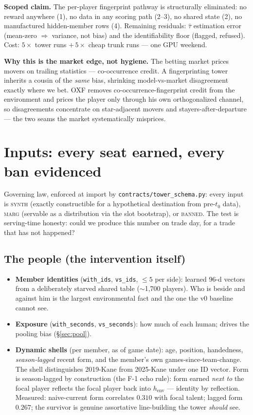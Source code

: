 \documentclass[11pt]{article}
\newcommand{\henv}{\ensuremath{h_{\mathrm{env}}}}
\begin{document}
\noindent\textbf{Scoped claim.} The per-player fingerprint pathway is
structurally eliminated: no reward anywhere (1), no data in any scoring path
(2--3), no shared state (2), no manufactured hidden-member rows (4). Remaining
residuals: $\hat\tau$ estimation error (mean-zero $\Rightarrow$ variance, not
bias) and the identifiability floor (flagged, refused). Cost: $5\times$ tower
runs $+\,5\times$ cheap trunk runs --- one GPU weekend.

\noindent\textbf{Why this is the market edge, not hygiene.} The betting market
prices movers on trailing statistics --- co-occurrence credit. A fingerprinting
tower inherits a cousin of the \emph{same} bias, shrinking model-vs-market
disagreement exactly where we bet. OXF removes co-occurrence-fingerprint credit
from the environment and prices the player only through his own orthogonalized
channel, so disagreements concentrate on star-adjacent movers and
stayers-after-departure --- the two seams the market systematically misprices.

\section{Inputs: every seat earned, every ban evidenced}
Governing law, enforced at import by \texttt{contracts/tower\_schema.py}: every
input is \textsc{synth} (exactly constructible for a hypothetical destination
from pre-$t_0$ data), \textsc{marg} (servable as a distribution via the slot
bootstrap), or \textsc{banned}. The test is serving-time honesty: could we
produce this number on trade day, for a trade that has not happened?

\subsection{The people (the intervention itself)}
\begin{itemize}[leftmargin=1.2em,itemsep=2pt]
\item \textbf{Member identities} (\texttt{with\_ids}, \texttt{vs\_ids},
$\le\!5$ per side): learned 96-d vectors from a deliberately starved shared
table ($\sim$1{,}700 players). Who is beside and against him is the largest
environmental fact and the one the v0 baseline cannot see.
\item \textbf{Exposure} (\texttt{with\_seconds}, \texttt{vs\_seconds}): how much
of each human; drives the pooling bias (\S\ref{sec:pool}).
\item \textbf{Dynamic shells} (per member, as of game date): age, position,
handedness, \emph{season-lagged} recent form, and the member's own
games-since-team-change. The shell distinguishes 2019-Kane from 2025-Kane under
one ID vector. Form is season-lagged by construction (the F-1 echo rule): form
earned \emph{next to} the focal player reflects the focal player back into
\henv{} --- identity by reflection. Measured: naive-current form correlates
$0.310$ with focal talent; lagged form $0.267$; the survivor is genuine
assortative line-building the tower \emph{should} see.
\end{itemize}
\end{document}

